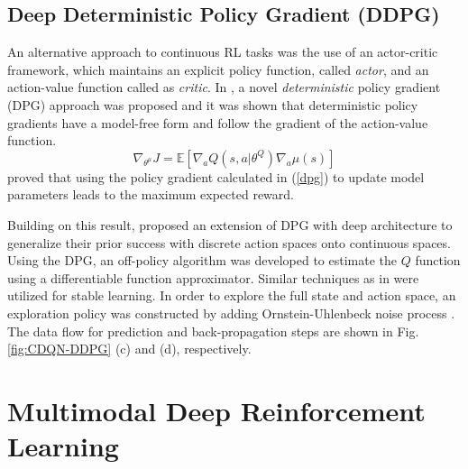 \documentclass[../thesis.tex]{subfiles}
\begin{document}
\subsection{Deep Deterministic Policy Gradient (DDPG)}
An alternative approach to continuous RL tasks was the use of an actor-critic framework, which maintains an explicit policy function, called \textit{actor}, and an action-value function called as \textit{critic}. 
In \citet{dpg}, a novel \emph{deterministic} policy gradient (DPG) approach was proposed and it was shown that deterministic policy gradients have a model-free form and follow the gradient of the action-value function. 
\begin{equation}
\nabla_{\theta^\mu} J = \mathbb{E}[\nabla_a Q(s,a|\theta^Q) \nabla_a \mu(s)]
\label{dpg}
\end{equation}
\citet{dpg} proved that using the policy gradient calculated in (\ref{dpg}) to update model parameters leads to the maximum expected reward.

Building on this result, \citet{DBLP:journals/corr/LillicrapHPHETS15} proposed an extension of DPG with deep architecture to generalize their prior success with discrete action spaces \cite{mnih2015human} onto continuous spaces. Using the DPG, an off-policy algorithm was developed to estimate the $Q$ function using a differentiable function approximator. Similar techniques as in \cite{mnih2015human} were utilized for stable learning. In order to explore the full state and action space, an exploration policy was constructed by adding Ornstein-Uhlenbeck noise process \cite{uhlenbeck1930theory}.
The data flow for prediction and back-propagation steps are shown in Fig. \ref{fig:CDQN-DDPG} (c) and (d), respectively.

\section{Multimodal Deep Reinforcement Learning}
\end{document}
